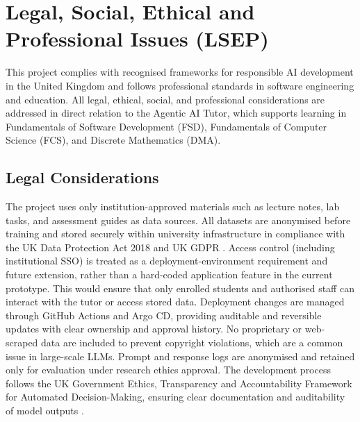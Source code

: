 \section{Legal, Social, Ethical and Professional Issues (LSEP)}
This project complies with recognised frameworks for responsible AI development in the United Kingdom and follows professional standards in software engineering and education. All legal, ethical, social, and professional considerations are addressed in direct relation to the Agentic AI Tutor, which supports learning in Fundamentals of Software Development (FSD), Fundamentals of Computer Science (FCS), and Discrete Mathematics (DMA).

\subsection{Legal Considerations}
The project uses only institution-approved materials such as lecture notes, lab tasks, and assessment guides as data sources. All datasets are anonymised before training and stored securely within university infrastructure in compliance with the UK Data Protection Act 2018 and UK GDPR \parencite{Dataprot22:online}. Access control (including institutional SSO) is treated as a deployment-environment requirement and future extension, rather than a hard-coded application feature in the current prototype. This would ensure that only enrolled students and authorised staff can interact with the tutor or access stored data. Deployment changes are managed through GitHub Actions and Argo CD, providing auditable and reversible updates with clear ownership and approval history. No proprietary or web-scraped data are included to prevent copyright violations, which are a common issue in large-scale LLMs. Prompt and response logs are anonymised and retained only for evaluation under research ethics approval. The development process follows the UK Government Ethics, Transparency and Accountability Framework for Automated Decision-Making, ensuring clear documentation and auditability of model outputs \parencite{EthicsTr15:online}.

